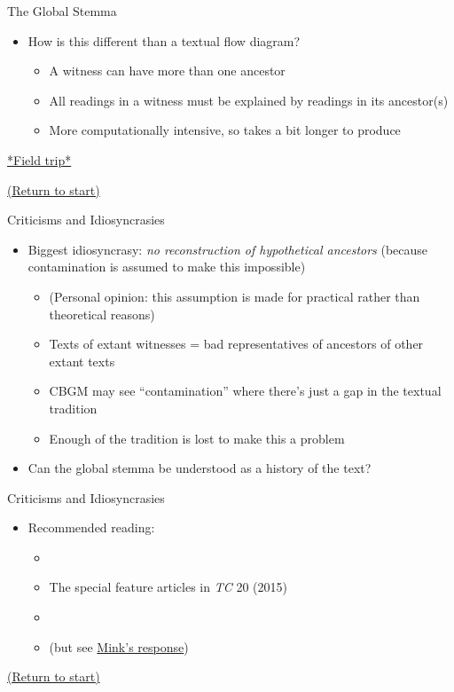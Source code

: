 \documentclass[10pt]{beamer}
\begin{document}
	\begin{frame}{The Global Stemma}
		\begin{itemize}
			\item How is this different than a textual flow diagram?
			\begin{itemize}
				\item A witness can have more than one ancestor
				\item All readings in a witness must be explained by readings in its ancestor(s)
				\item More computationally intensive, so takes a bit longer to produce
			\end{itemize}
		\end{itemize}
		\begin{center}
			\href{../graphics/global-stemma-complete-reoriented.pdf}{*Field trip*}
		\end{center}
		\begin{center}
			\hyperlink{slide:crossroad}{(Return to start)}
		\end{center}
	\end{frame}
	\begin{frame}{Criticisms and Idiosyncrasies}\label{slide:criticisms}
		\begin{itemize}
			\item Biggest idiosyncrasy: \emph{no reconstruction of hypothetical ancestors} (because contamination is assumed to make this impossible)
			\begin{itemize}
				\item (Personal opinion: this assumption is made for practical rather than theoretical reasons)
				\item Texts of extant witnesses = bad representatives of ancestors of other extant texts
				\item CBGM may see ``contamination'' where there's just a gap in the textual tradition
				\item Enough of the tradition is lost to make this a problem
			\end{itemize}
			\item Can the global stemma be understood as a history of the text?
		\end{itemize}
	\end{frame}
	\begin{frame}{Criticisms and Idiosyncrasies}
		\begin{itemize}
			\item Recommended reading:
			\begin{itemize}
				\item \cite{Jongkind14}
				\item The special feature articles in \emph{TC} 20 (2015)
				\item \cite{Gurry18}
				\item \cite{Carlson20} (but see \href{http://ntvmr.uni-muenster.de/en_US/intfblog/-/blogs/remarks-on-carlson-a-bias-at-the-heart-of-the-cbgm-guest-post-by-gerd-mink-}{Mink's response})
			\end{itemize}
		\end{itemize}
		\begin{center}
			\hyperlink{slide:crossroad}{(Return to start)}
		\end{center}
	\end{frame}
\end{document}
